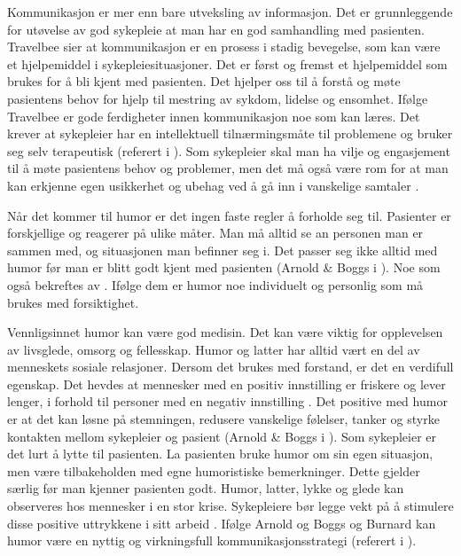 Kommunikasjon er mer enn bare utveksling av informasjon. Det er grunnleggende
for utøvelse av god sykepleie at man har en god samhandling med pasienten.
Travelbee sier at kommunikasjon er en prosess i stadig bevegelse, som kan være
et hjelpemiddel i sykepleiesituasjoner. Det er først og fremst et hjelpemiddel
som brukes for å bli kjent med pasienten. Det hjelper oss til å forstå og møte
pasientens behov for hjelp til mestring av sykdom, lidelse og ensomhet. Ifølge
Travelbee er gode ferdigheter innen kommunikasjon noe som kan læres. Det krever
at sykepleier har en intellektuell tilnærmingsmåte til problemene og bruker seg
selv terapeutisk (referert i ). Som
sykepleier skal man ha vilje og engasjement til å møte pasientens behov og
problemer, men det må også være rom for at man kan erkjenne egen usikkerhet og
ubehag ved å gå inn i vanskelige samtaler
\cite[s.~81]{reitan2008.kommunikasjon}.

Når det kommer til humor er det ingen faste regler å forholde seg til.
Pasienter er forskjellige og reagerer på ulike måter. Man må alltid se an
personen man er sammen med, og situasjonen man befinner seg i. Det passer seg
ikke alltid med humor før man er blitt godt kjent med pasienten (Arnold \&{}
Boggs i ). Noe som også bekreftes av
. Ifølge dem er humor noe individuelt og personlig
som må brukes med forsiktighet.

Vennligsinnet humor kan være god medisin. Det kan være viktig for opplevelsen
av livsglede, omsorg og fellesskap. Humor og latter har alltid vært en del av
menneskets sosiale relasjoner. Dersom det brukes med forstand, er det en
verdifull egenskap. Det hevdes at mennesker med en positiv innstilling er
friskere og lever lenger, i forhold til personer med en negativ innstilling
\cite[s.~55]{bohn2000}. Det positive med humor er at det kan løsne på
stemningen, redusere vanskelige følelser, tanker og styrke kontakten mellom
sykepleier og pasient (Arnold \&{} Boggs i ). Som
sykepleier er det lurt å lytte til pasienten. La pasienten bruke humor om sin
egen situasjon, men være tilbakeholden med egne humoristiske bemerkninger.
Dette gjelder særlig før man kjenner pasienten godt. Humor, latter, lykke og
glede kan observeres hos mennesker i en stor krise. Sykepleiere bør legge vekt
på å stimulere disse positive uttrykkene i sitt arbeid \cite[s.~169]{wist2002}.
Ifølge Arnold og Boggs og Burnard kan humor være en nyttig og virkningsfull
kommunikasjonsstrategi (referert i ).

